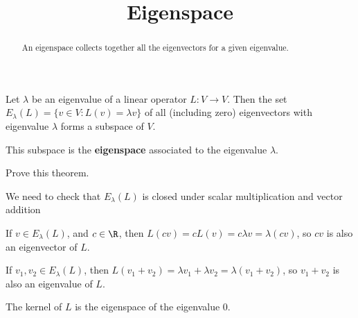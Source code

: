 \documentclass{ximera}
\title{Eigenspace}
\begin{document}
\begin{abstract}
  An eigenspace collects together all the eigenvectors for a given eigenvalue.
\end{abstract}

\begin{theorem}
  Let $\lambda$ be an eigenvalue of a linear operator $L:V\to V$.
  Then the set $E_\lambda(L) = \{ v \in V: L(v) = \lambda v\}$ of all
  (including zero) eigenvectors with eigenvalue $\lambda$ forms a
  subspace of $V$.

  This subspace is the \textbf{eigenspace} associated to the
  eigenvalue $\lambda$.
\end{theorem}

Prove this theorem.
\begin{free-response}
	We need to check that $E_\lambda(L)$ is closed under scalar multiplication and vector addition
	
	If $v \in E_\lambda(L)$, and $c \in \R$, then $L(cv) = cL(v) = c\lambda v = \lambda( cv)$, so $cv$ is also an eigenvector of $L$.
	
	If $v_1,v_2 \in E_\lambda(L)$, then $L(v_1+v_2) = \lambda v_1+\lambda v_2 = \lambda( v_1 + v_2)$, so $v_1+v_2$ is also an eigenvalue of $L$.
\end{free-response}

The kernel of $L$ is the eigenspace of the eigenvalue $0$.
\end{document}
